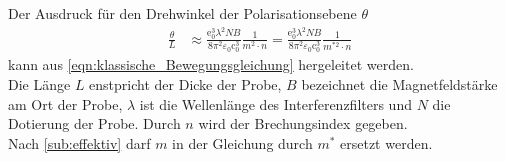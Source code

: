 Der Ausdruck für den Drehwinkel der Polarisationsebene $\theta$ 
\begin{align}
   \frac{\theta}{L}& \approx \frac{\text{e}_0^3\lambda^2 NB}{8\pi^2\varepsilon_0\text{c}_0^3}\frac{1}{m^2 \cdot n} = \frac{\text{e}_0^3\lambda^2 NB}{8\pi^2\varepsilon_0\text{c}_0^3}\frac{1}{m^{*2} \cdot n}\label{eqn:drehwinkel}
\end{align}
kann aus \autoref{eqn:klassische_Bewegungsgleichung} hergeleitet werden.\\
Die Länge $L$ enstpricht der Dicke der Probe, $B$ bezeichnet die Magnetfeldstärke am Ort der Probe, $\lambda$ ist die Wellenlänge des
Interferenzfilters und $N$ die Dotierung der Probe. Durch $n$ wird der Brechungsindex gegeben.\\
Nach \autoref{sub:effektiv} darf $m$ in der Gleichung durch $m^*$ ersetzt werden.